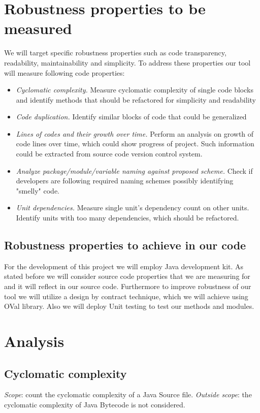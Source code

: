   \section{Robustness properties to be measured}
    We will target specific robustness properties such as code transparency, readability, maintainability and simplicity. To address these properties our tool will measure following code properties:
      \begin{itemize}
	\item \emph{Cyclomatic complexity.} Measure cyclomatic complexity of single code blocks and identify methods that should be refactored for simplicity and readability
	\item \emph{Code duplication.} Identify similar blocks of code that could be generalized
	\item \emph{Lines of codes and their growth over time.} Perform an analysis on growth of code lines over time, which could show progress of project. Such information could be extracted from source code version control system.
	\item \emph{Analyze package/module/variable naming against proposed scheme.} Check if developers are following required naming schemes possibly identifying "smelly" code.
	\item \emph{Unit dependencies.} Measure single unit's dependency count on other units. Identify units with too many dependencies, which should be refactored.
      \end{itemize}

  \subsection{Robustness properties to achieve in our code}
    For the development of this project we will employ Java development kit. As stated before we will consider source code properties that we are measuring for and it will reflect in our source code. Furthermore to improve robustness of our tool we will utilize a design by contract technique, which we will achieve using OVal library. Also we will deploy Unit testing to test our methods and modules.

\section{Analysis}

  \subsection{Cyclomatic complexity}
    \emph{Scope}: count the cyclomatic complexity of a Java Source file. \emph{Outside scope}: the cyclomatic complexity of Java Bytecode is not considered.
    
